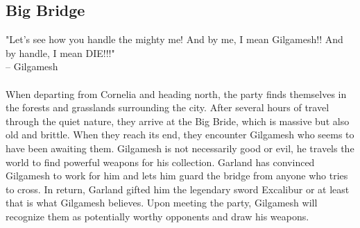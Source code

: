 \subsection*{Big Bridge}
"Let's see how you handle the mighty me! And by me, I mean Gilgamesh!! And by handle, I mean DIE!!!" \\
\indent -- Gilgamesh \\\\
\noindent
When departing from Cornelia and heading north, the party finds themselves in the forests and grasslands surrounding the city.
After several hours of travel through the quiet nature, they arrive at the Big Bride, which is massive but also old and brittle.
When they reach its end, they encounter Gilgamesh who seems to have been awaiting them.
Gilgamesh is not necessarily good or evil, he travels the world to find powerful weapons for his collection.
Garland has convinced Gilgamesh to work for him and lets him guard the bridge from anyone who tries to cross.
In return, Garland gifted him the legendary sword Excalibur or at least that is what Gilgamesh believes.
Upon meeting the party, Gilgamesh will recognize them as potentially worthy opponents and draw his weapons.
\pagebreak


